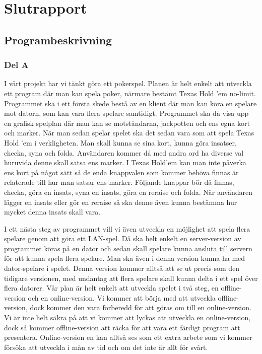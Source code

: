 \documentclass[10pt,twoside,a4paper]{article}
\begin{document}
\section*{Slutrapport}

\subsection*{Programbeskrivning}

\subsubsection*{Del A}

I vårt projekt har vi tänkt göra ett pokerspel. Planen är helt enkelt att
utveckla ett program där man kan spela poker, närmare bestämt Texas Hold
’em no-limit. Programmet ska i ett första skede bestå av en klient där man
kan köra en spelare mot datorn, som kan vara flera spelare samtidigt.
Programmet ska då visa upp en grafisk spelplan där man kan se motståndarna,
jackpotten och ens egna kort och marker. När man sedan spelar spelet ska
det sedan vara som att spela Texas Hold ’em i verkligheten. Man skall kunna
se sina kort, kunna göra insatser, checka, syna och folda. Användaren
kommer då med andra ord ha diverse val huruvida denne skall satsa ens
marker. I Texas Hold’em kan man inte påverka ens kort på något sätt så de
enda knappvalen som kommer behöva finnas är relaterade till hur man satsar
ens marker. Följande knappar bör då finnas, checka, göra en insats, syna en
insats, göra en reraise och folda. När användaren lägger en insats eller
gör en reraise så ska denne även kunna bestämma hur mycket denna insats
skall vara.

I ett nästa steg av programmet vill vi även utveckla en möjlighet att spela
flera spelare genom att göra ett LAN-spel. Då ska helt enkelt en
server-version av programmet köras på en dator och sedan skall spelare
kunna ansluta till servern för att kunna spela flera spelare. Man ska även
i denna version kunna ha med dator-spelare i spelet. Denna version kommer
alltså att se ut precis som den tidigare versionen, med undantag att flera
spelare skall kunna delta i ett spel över flera datorer. Vår plan är helt
enkelt att utveckla spelet i två steg, en offline-version och en
online-version. Vi kommer att börja med att utveckla offline-version, dock
kommer den vara förberedd för att göras om till en online-version. Vi är
inte helt säkra på att vi kommer att lyckas att utveckla en online-version,
dock så kommer offline-version att räcka för att vara ett färdigt program
att presentera. Online-version en kan alltså ses som ett extra arbete som
vi kommer försöka att utveckla i mån av tid och om det inte är allt för
svårt.
\end{document}
